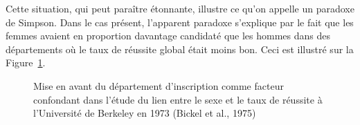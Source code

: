 \documentclass[
  letterpaper,
]{book}
\begin{document}
Cette situation, qui peut paraître étonnante, illustre ce qu'on appelle
un paradoxe de Simpson. Dans le cas présent, l'apparent paradoxe
s'explique par le fait que les femmes avaient en proportion davantage
candidaté que les hommes dans des départements où le taux de réussite
global était moins bon. Ceci est illustré sur la
Figure~\ref{fig-distriUCBA}.

\begin{figure}


\caption{\label{fig-distriUCBA}Mise en avant du département
d'inscription comme facteur confondant dans l'étude du lien entre le
sexe et le taux de réussite à l'Université de Berkeley en 1973 (Bickel
et al., 1975)}

\end{figure}%
\end{document}
